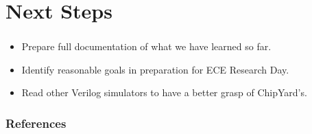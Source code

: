 \documentclass{../weeklyslides}
\begin{document}
\section{Next Steps}\label{sec:Next_Steps}
\begin{frame}
  \frametitle{}
  \begin{itemize}
  \item Prepare full documentation of what we have learned so far.
  \item Identify reasonable goals in preparation for ECE Research Day.
  \item Read other Verilog simulators to have a better grasp of ChipYard's.
  \end{itemize}
\end{frame}

\begin{frame}
  \frametitle{References}
  \printbibliography[heading=bibintoc]{}
\end{frame}
\end{document}
